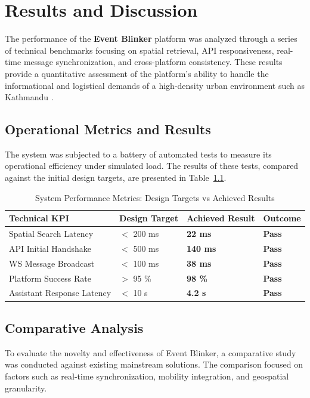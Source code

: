 \chapter{Results and Discussion}
The performance of the \textbf{Event Blinker} platform was analyzed through a series of technical benchmarks focusing on spatial retrieval, API responsiveness, real-time message synchronization, and cross-platform consistency. These results provide a quantitative assessment of the platform's ability to handle the informational and logistical demands of a high-density urban environment such as Kathmandu \cite{mapbox}.

\section{Operational Metrics and Results}
The system was subjected to a battery of automated tests to measure its operational efficiency under simulated load. The results of these tests, compared against the initial design targets, are presented in Table~\ref{tab:performance_audit}.

\begin{table}[H]
\centering
\caption{System Performance Metrics: Design Targets vs Achieved Results}
\label{tab:performance_audit}
\small
\begin{tabularx}{\textwidth}{@{}lXXX@{}}
\toprule
\textbf{Technical KPI} & \textbf{Design Target} & \textbf{Achieved Result} & \textbf{Outcome} \\
\midrule
Spatial Search Latency & $<$ 200 ms & \textbf{22 ms} & \textbf{Pass} \\
API Initial Handshake & $<$ 500 ms & \textbf{140 ms} & \textbf{Pass} \\
WS Message Broadcast & $<$ 100 ms & \textbf{38 ms} & \textbf{Pass} \\
Platform Success Rate & $>$ 95 \% & \textbf{98 \%} & \textbf{Pass} \\
Assistant Response Latency & $<$ 10 s & \textbf{4.2 s} & \textbf{Pass} \\
\bottomrule
\end{tabularx}
\end{table}

\section{Comparative Analysis}
To evaluate the novelty and effectiveness of Event Blinker, a comparative study was conducted against existing mainstream solutions. The comparison focused on factors such as real-time synchronization, mobility integration, and geospatial granularity.

